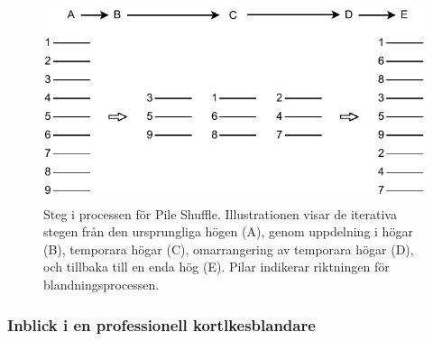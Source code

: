 \documentclass[swedish,a4paper]{article}
\begin{document}
\begin{figure}[H]
	\begin{center}
		\includegraphics{images/pile_shuffle.pdf}
	\end{center}
	\captionsetup{justification=centering,margin=4cm}
	\caption{Steg i processen för Pile Shuffle. Illustrationen visar de
	iterativa stegen från den ursprungliga högen (A), genom uppdelning i
	högar (B), temporara högar (C), omarrangering av temporara högar (D),
	och tillbaka till en enda hög (E). Pilar indikerar riktningen för
	blandningsprocessen.
	}
	\label{fig:pile_shuffle}
\end{figure}


\subsubsection{Inblick i en professionell kortlkesblandare}
\label{sec:wheel}
\end{document}
